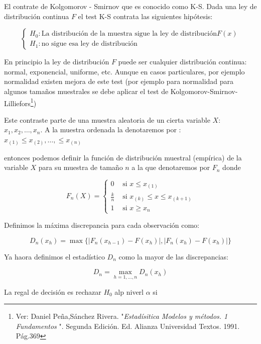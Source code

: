 \documentclass[12pt]{report}
\begin{document}
           
           El contrate de Kolgomorov - Smirnov  que es conocido como K-S. Dada una ley de distribución continua $F$ el test K-S contrata las siguientes hipótesis:
           
           $$\left\{ \begin {array}{ll}
           H_0: \mbox{La distribución de la muestra sigue la ley de distribución} F(x)\\
           H_1: \mbox{no sigue esa ley de distribución}\end{array}\right.$$
           
           
          En principio la ley de distribución $F$ puede ser cualquier distribución continua: normal, exponencial, uniforme, etc. Aunque en casos particulares, por ejemplo normalidad existen mejora de este test (por ejemplo para normalidad para algunos tamaños muestrales se debe aplicar el test de Kolgomorov-Smirnov-Lilliefors\footnote{Ver: Daniel Peña,Sánchez Rivera. "\emph{Estadísitica Modelos y métodos. 1 Fundamentos }". Segunda Edición. Ed.  Alianza Universidad Textos. 1991. Pág.369})
           
           Este contraste parte de una muestra aleatoria de un cierta variable $X$: $x_1,x_2,\ldots,x_n$. A la muestra ordenada la denotaremos por :
           $x_{(1)}\leq x_{(2)},\ldots,\leq x_{(n)}$
           
           entonces podemos definir la función de distribución  muestral (empírica) de la variable $X$ para su muestra de tamaño $n$ a la que denotaremos por $F_{n}$  donde
           
           
           $$F_n(X)=\left\{\begin{array}{ll}
 0 &\mbox{ si } x\leq x_{(1)}  \\
  \frac{k}{n}&\mbox{ si }   x_{(k)}\leq  x \leq x_{(k+1)}\\
1 & \mbox{ si } x    \geq x_{n}  
\end{array}\right.$$


Definimos la máxima discrepancia para cada observación como:

$$D_n(x_h)=\max\{\left| F_{n}(x_{h-1})-F(x_h)\right|, \left| F_{n}(x_{h})-F(x_h)\right|\}$$
           
          Ya haora definimos el estadístico $D_n$ como la mayor de las discrepancias:
          
$$D_n=\max_{h=1,\ldots, n}D_n(x_h)$$ 


La regal de decisión es rechazar $H_0$ alp niverl $\alpha$ si 
\end{document}
